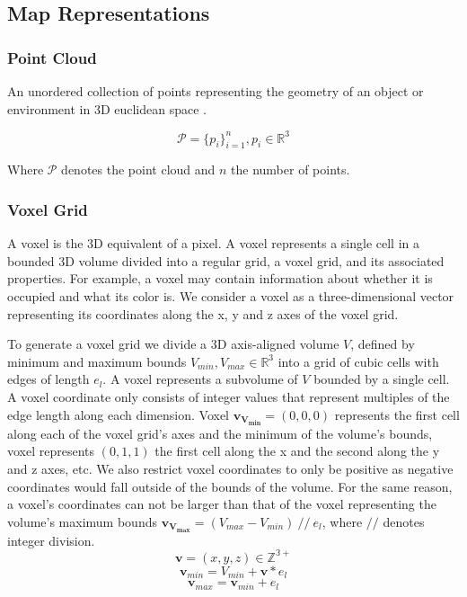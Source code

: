 \subsection{Map Representations}

\subsubsection{Point Cloud}
An unordered collection of points representing the geometry of an object or environment in 3D euclidean space \citep{volodine_point_2007}.

\begin{equation}
\mathcal{P}=\{p_i\}_{i=1}^n, p_i \in \mathbb{R}^3
\end{equation}

Where \(\mathcal{P}\) denotes the point cloud and \(n\) the number of points.

\subsubsection{Voxel Grid}
A voxel is the 3D equivalent of a pixel. A voxel represents a single cell in a bounded 3D volume divided into a regular grid, a voxel grid, and its associated properties. For example, a voxel may contain information about whether it is occupied and what its color is. We consider a voxel as a three-dimensional vector representing its coordinates along the x, y and z axes of the voxel grid. 

To generate a voxel grid we divide a 3D axis-aligned volume \(V\), defined by minimum and maximum bounds \(V_{min}, V_{max} \in \mathbb{R}^{3}\) into a grid of cubic cells with edges of length \(e_{l}\). A voxel represents a subvolume of \(V\) bounded by a single cell. A voxel coordinate only consists of integer values that represent multiples of the edge length along each dimension. Voxel \(\boldsymbol{v_{V_{min}}} = (0,0,0)\) represents the first cell along each of the voxel grid's axes and the minimum of the volume's bounds, voxel represents \((0,1,1)\) the first cell along the x and the second along the y and z axes, etc. We also restrict voxel coordinates to only be positive as negative coordinates would fall outside of the bounds of the volume. For the same reason, a voxel's coordinates can not be larger than that of the voxel representing the volume's maximum bounds \(\boldsymbol{v_{V_{max}}} = (V_{max} - V_{min})\ //\ e_l\), where \(//\) denotes integer division. 
\begin{equation}
\boldsymbol{v} = (x, y, z) \in \mathbb{Z^{3+}}
\end{equation}
\begin{equation}
    \label{eq:vmin}
\boldsymbol{v}_{min} = V_{min} + \boldsymbol{v}*e_{l}
\end{equation}
\begin{equation}
    \label{eq:vmax}
\boldsymbol{v}_{max} = \boldsymbol{v}_{min} + e_{l}
\end{equation}

